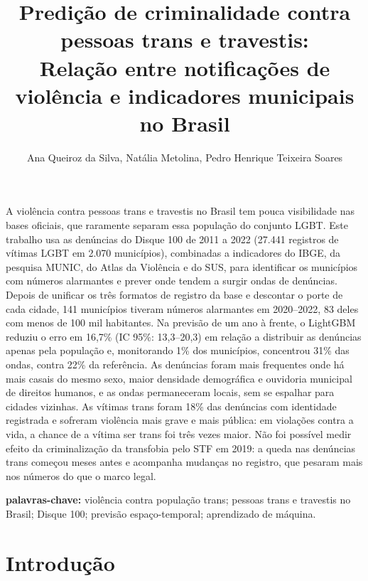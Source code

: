 \documentclass[12pt]{article}
\title{Predição de criminalidade contra pessoas trans e travestis: \\ Relação entre notificações de violência e indicadores municipais no Brasil}
\author{Ana Queiroz da Silva, Natália Metolina, Pedro Henrique Teixeira Soares}
\begin{document}
\maketitle
     
\begin{resumo}
A violência contra pessoas trans e travestis no Brasil tem pouca visibilidade nas bases oficiais, que raramente separam essa população do conjunto LGBT. Este trabalho usa as denúncias do Disque 100 de 2011 a 2022 (27.441 registros de vítimas LGBT em 2.070 municípios), combinadas a indicadores do IBGE, da pesquisa MUNIC, do Atlas da Violência e do SUS, para identificar os municípios com números alarmantes e prever onde tendem a surgir ondas de denúncias. Depois de unificar os três formatos de registro da base e descontar o porte de cada cidade, 141 municípios tiveram números alarmantes em 2020--2022, 83 deles com menos de 100 mil habitantes. Na previsão de um ano à frente, o LightGBM reduziu o erro em 16,7\% (IC 95\%: 13,3--20,3) em relação a distribuir as denúncias apenas pela população e, monitorando 1\% dos municípios, concentrou 31\% das ondas, contra 22\% da referência. As denúncias foram mais frequentes onde há mais casais do mesmo sexo, maior densidade demográfica e ouvidoria municipal de direitos humanos, e as ondas permaneceram locais, sem se espalhar para cidades vizinhas. As vítimas trans foram 18\% das denúncias com identidade registrada e sofreram violência mais grave e mais pública: em violações contra a vida, a chance de a vítima ser trans foi três vezes maior. Não foi possível medir efeito da criminalização da transfobia pelo STF em 2019: a queda nas denúncias trans começou meses antes e acompanha mudanças no registro, que pesaram mais nos números do que o marco legal.

\textbf{palavras-chave:} violência contra população trans; pessoas trans e travestis no Brasil; Disque 100; previsão espaço-temporal; aprendizado de máquina.
\end{resumo}


\section{Introdução}
\end{document}
